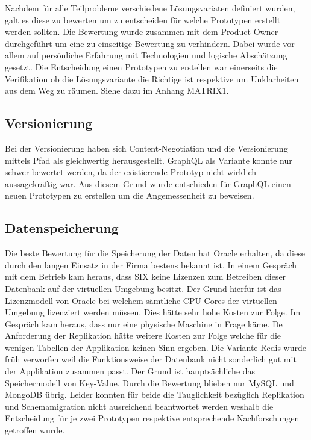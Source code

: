Nachdem für alle Teilprobleme verschiedene Lösungsvariaten definiert wurden, galt es diese zu bewerten um zu entscheiden für welche Prototypen erstellt werden sollten. Die Bewertung wurde zusammen mit dem Product Owner durchgeführt um eine zu einseitige Bewertung zu verhindern. Dabei wurde vor allem auf persönliche Erfahrung mit Technologien und logische Abschätzung gesetzt. Die Entscheidung einen Prototypen zu erstellen war einerseits die Verifikation ob die Lösungsvariante die Richtige ist respektive um Unklarheiten aus dem Weg zu räumen. Siehe dazu im Anhang MATRIX1.

\subsection{Versionierung}

Bei der Versionierung haben sich Content-Negotiation und die Versionierung mittels Pfad als gleichwertig herausgestellt. GraphQL als Variante konnte nur schwer bewertet werden, da der existierende Prototyp nicht wirklich aussagekräftig war. Aus diesem Grund wurde entschieden für GraphQL einen neuen Prototypen zu erstellen um die Angemessenheit zu beweisen.

\subsection{Datenspeicherung}

Die beste Bewertung für die Speicherung der Daten hat Oracle erhalten, da diese durch den langen Einsatz in der Firma bestens bekannt ist. In einem Gespräch mit dem Betrieb kam heraus, dass SIX keine Lizenzen zum Betreiben dieser Datenbank auf der virtuellen Umgebung besitzt. Der Grund hierfür ist das Lizenzmodell von Oracle bei welchem sämtliche CPU Cores der virtuellen Umgebung lizenziert werden müssen. Dies hätte sehr hohe Kosten zur Folge. Im Gespräch kam heraus, dass nur eine physische Maschine in Frage käme. 
De Anforderung der Replikation hätte weitere Kosten zur Folge welche für die wenigen Tabellen der Applikation keinen Sinn ergeben.
Die Variante Redis wurde früh verworfen weil die Funktionsweise der Datenbank nicht sonderlich gut mit der Applikation zusammen passt. Der Grund ist hauptsächliche das Speichermodell von Key-Value.
Durch die Bewertung blieben nur MySQL und MongoDB übrig. Leider konnten für beide die Tauglichkeit bezüglich Replikation und Schemamigration nicht ausreichend beantwortet werden weshalb die Entscheidung für je zwei Prototypen respektive entsprechende Nachforschungen getroffen wurde.

